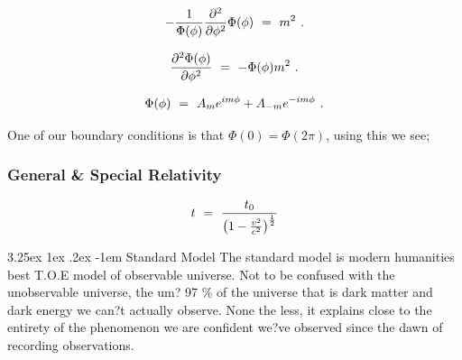 \documentclass{article}
\makeatletter
\newcounter{subsubsubsection}[subsubsection]
\renewcommand\subparagraph{\@startsection{subparagraph}{6}{\parindent}%
  {3.25ex \@plus1ex \@minus .2ex}%
  {-1em}%
  {\normalfont\normalsize\bfseries}}
\makeatother
\begin{document}
\begin{equation} \label{eb-eq-256-54}
- \frac{1}{\Phi(\phi)} \frac{\partial^{2}}{\partial{\phi^{2}}} \Phi(\phi) \hspace{0.125cm} = \hspace{0.125cm} m^2 \hspace{0.125cm}.
\end{equation}

\begin{equation} \label{eb-eq-256-55}
\frac{\partial^{2}{\Phi(\phi)}}{\partial{\phi^{2}}} \hspace{0.125cm} = \hspace{0.125cm} - \Phi(\phi) m^2 \hspace{0.125cm}.
\end{equation}

\begin{equation} \label{eb-eq-256-56}
\Phi(\phi) \hspace{0.125cm} = \hspace{0.125cm} A_{m} e^{im\phi} + A_{-m} e^{-im\phi} \hspace{0.125cm}.
\end{equation}

One of our boundary conditions is that \begin{math} \Phi(0) = \Phi(2 \pi) \end{math}, using this we see; 

\subsubsection{General \& Special Relativity}\label{sec:general-and-special-relativity}

\begin{equation} \label{eb-eq-101-1}
t \hspace{0.125cm} = \hspace{0.125cm} \frac{t_0}{\big(1 - \frac{v^{2}}{c^{2}} \big)^\frac{1}{2}}
\end{equation}


\subparagraph{Standard Model}
The standard model is modern humanities best T.O.E model of observable universe. Not to be confused with the unobservable universe, the um? 97 \% of the universe that is dark matter and dark energy we can?t actually observe. None the less, it explains close to the entirety of the phenomenon we are confident we?ve observed since the dawn of recording observations. \\
\end{document}
